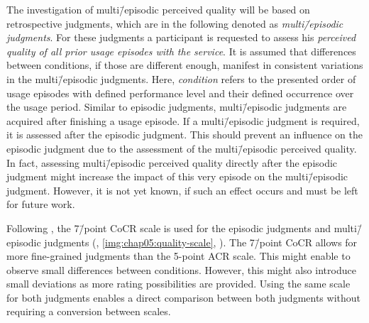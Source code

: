 The investigation of multi\=/episodic perceived quality will be based on retrospective judgments, which are in the following denoted as \emph{multi\=/episodic judgments}.
For these judgments a participant is requested to assess his \emph{perceived quality of all prior usage episodes with the service}.
It is assumed that differences between conditions, if those are different enough, manifest in consistent variations in the multi\=/episodic judgments.
Here, \emph{condition} refers to the presented order of usage episodes with defined performance level and their defined occurrence over the usage period.
Similar to episodic judgments, multi\=/episodic judgments are acquired after finishing a usage episode.
If a multi\=/episodic judgment is required, it is assessed after the episodic judgment.
This should prevent an influence on the episodic judgment due to the assessment of the multi\=/episodic perceived quality.
In fact, assessing multi\=/episodic perceived quality directly after the episodic judgment might increase the impact of this very episode on the multi\=/episodic judgment.
However, it is not yet known, if such an effect occurs and must be left for future work.

Following \citet{moller_single-call_2011}, the 7\=/point \acf{CoCR} scale is used for the episodic judgments and multi\=/episodic judgments (\cf, \autoref{img:chap05:quality-scale}, ).
The 7\=/point \ac{CoCR} allows for more fine-grained judgments than the 5-point \ac{ACR} scale.
This might enable to observe small differences between conditions.
However, this might also introduce small deviations as more rating possibilities are provided.
Using the same scale for both judgments enables a direct comparison between both judgments without requiring a conversion between scales.

